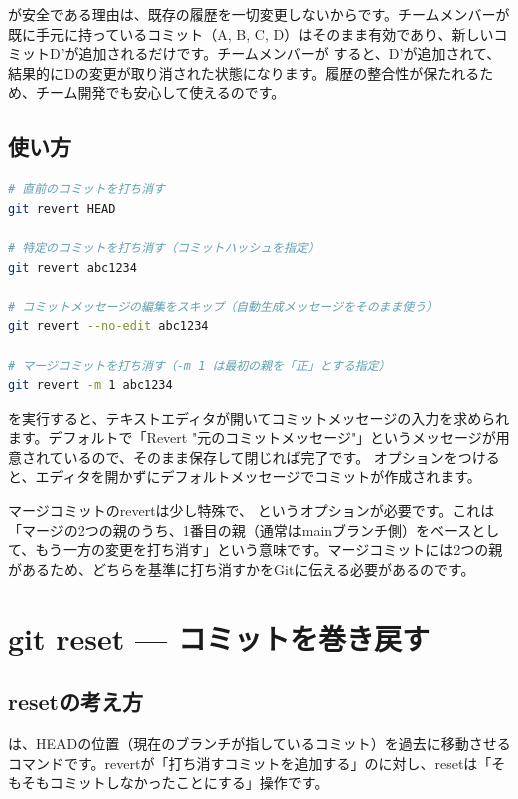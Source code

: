  が安全である理由は、既存の履歴を一切変更しないからです。チームメンバーが既に手元に持っているコミット（A, B, C, D）はそのまま有効であり、新しいコミットD'が追加されるだけです。チームメンバーが  すると、D'が追加されて、結果的にDの変更が取り消された状態になります。履歴の整合性が保たれるため、チーム開発でも安心して使えるのです。

\subsection{使い方}

\begin{lstlisting}[language=bash]
# 直前のコミットを打ち消す
git revert HEAD

# 特定のコミットを打ち消す（コミットハッシュを指定）
git revert abc1234

# コミットメッセージの編集をスキップ（自動生成メッセージをそのまま使う）
git revert --no-edit abc1234

# マージコミットを打ち消す（-m 1 は最初の親を「正」とする指定）
git revert -m 1 abc1234
\end{lstlisting}

 を実行すると、テキストエディタが開いてコミットメッセージの入力を求められます。デフォルトで「Revert "元のコミットメッセージ"」というメッセージが用意されているので、そのまま保存して閉じれば完了です。 オプションをつけると、エディタを開かずにデフォルトメッセージでコミットが作成されます。

マージコミットのrevertは少し特殊で、 というオプションが必要です。これは「マージの2つの親のうち、1番目の親（通常はmainブランチ側）をベースとして、もう一方の変更を打ち消す」という意味です。マージコミットには2つの親があるため、どちらを基準に打ち消すかをGitに伝える必要があるのです。

\section{git reset — コミットを巻き戻す}

\subsection{resetの考え方}

 は、HEADの位置（現在のブランチが指しているコミット）を過去に移動させるコマンドです。revertが「打ち消すコミットを追加する」のに対し、resetは「そもそもコミットしなかったことにする」操作です。

